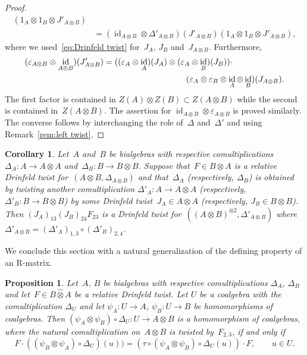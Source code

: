 \documentclass[12pt, reqno]{amsart}
\newcommand{\wh}[1]{\widehat{#1}}
\newtheorem{corollary}[theorem]{Corollary}
\newtheorem{proposition}[theorem]{Proposition}
\theoremstyle{definition}
\numberwithin{equation}{section}
\newcommand{\tensor}{\otimes}
\DeclareMathOperator{\id}{id}
\begin{document}
\begin{proof}
\begin{align*}
(1_A\tensor 1_B\tensor J'_{A\tensor B})\\
&=(\id_{A\tensor B}\tensor\Delta'_{A\tensor B})(J'_{A\tensor B})(1_A\tensor 1_B\tensor J'_{A\tensor B}),
\end{align*}
where we used~\eqref{eq:Drinfeld twist} for~$J_A$, $J_B$
and~$J_{A\tensor B}$. 
Furthermore, 
\begin{align*}
(\varepsilon_{A\tensor B}&\tensor\id_{A\tensor B})(J'_{A\tensor B})=((\varepsilon_A\tensor\id_A)(J_A)\tensor
(\varepsilon_A\tensor\id_B)(J_B))\cdot \\
&\mskip300mu(\varepsilon_A\tensor\varepsilon_B\tensor\id_A\tensor\id_B)(J_{A\tensor B}).
\end{align*}
The first factor is contained in $Z(A)\tensor Z(B)\subset Z(A\tensor B)$ while the second is contained in~$Z(A\tensor B)$.
The assertion for $\id_{A\tensor B}\tensor\varepsilon_{A\tensor B}$ is proved similarly. The converse follows by interchanging the role of~$\Delta$ and~$\Delta'$ and using Remark~\ref{rem:left twist}.
\end{proof}
\begin{corollary}\label{cor:twist from rel twist}
Let~$A$ and~$B$ be bialgebras with respective comultiplications~$\Delta_A:A\to A\tensor A$ and~$\Delta_B:B\to B\tensor B$.  
Suppose 
that~$F\in B\tensor A$ is a relative Drinfeld twist for~$(A\tensor B,\Delta_{A\tensor B})$ and that~$\Delta_A$ (respectively, $\Delta_B$)
is obtained by twisting another comultiplication $\Delta'_A:A\to A\tensor A$ (respectively, $\Delta'_B:B\to B\tensor B$)
by some Drinfeld twist~$J_A\in A\tensor A$ (respectively, $J_B\in B\tensor B$).
Then $(J_A)_{13}(J_B)_{24}F_{23}$ is a Drinfeld twist for~$((A\tensor B)^{\tensor 2},\Delta'_{A\tensor B})$ where $\Delta'_{A\tensor B}=(\Delta'_A)_{1,3}\circ(\Delta'_B)_{2,4}$.
\end{corollary}
We conclude this section with a natural generalization
of the defining property of an R-matrix.
\begin{proposition}\label{prop:rel twist comult prop}
Let~$A$, $B$ be bialgebras with respective comultiplications $\Delta_A$, $\Delta_B$
and let~$F\in B\wh\tensor A$ be a relative Drinfeld twist. Let $U$
be a coalgebra with the comultiplication $\Delta_U$
and let $\psi_A:U\to A$, $\psi_B:U\to B$ be homomorphisms of coalgebras. Then $(\psi_A\tensor\psi_B)\circ \Delta_U:U\to A\tensor B$ is a homomorphism of coalgebras,
where the natural comultiplication on~$A\tensor B$ is twisted by~$F_{2,3}$, if and only if
$$
F\cdot((\psi_B\tensor\psi_A)\circ\Delta_U)(u))=(\tau\circ(\psi_A\tensor\psi_B)\circ\Delta_U(u))\cdot F,\qquad u\in U.
$$
\end{proposition}
\end{document}
